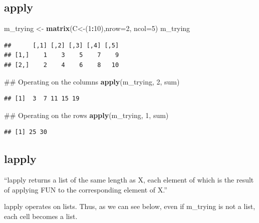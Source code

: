 \documentclass[]{book}
\newenvironment{Shaded}{\begin{snugshade}}{\end{snugshade}}
\newcommand{\KeywordTok}[1]{\textcolor[rgb]{0.13,0.29,0.53}{\textbf{#1}}}
\newcommand{\DataTypeTok}[1]{\textcolor[rgb]{0.13,0.29,0.53}{#1}}
\newcommand{\DecValTok}[1]{\textcolor[rgb]{0.00,0.00,0.81}{#1}}
\newcommand{\StringTok}[1]{\textcolor[rgb]{0.31,0.60,0.02}{#1}}
\newcommand{\OperatorTok}[1]{\textcolor[rgb]{0.81,0.36,0.00}{\textbf{#1}}}
\newcommand{\NormalTok}[1]{#1}
\begin{document}
\subsection{apply}\label{apply}

\begin{Shaded}
\begin{Highlighting}[]
\NormalTok{m_trying <-}\StringTok{ }\KeywordTok{matrix}\NormalTok{(C<-(}\DecValTok{1}\OperatorTok{:}\DecValTok{10}\NormalTok{),}\DataTypeTok{nrow=}\DecValTok{2}\NormalTok{, }\DataTypeTok{ncol=}\DecValTok{5}\NormalTok{)}
\NormalTok{m_trying}
\end{Highlighting}
\end{Shaded}

\begin{verbatim}
##      [,1] [,2] [,3] [,4] [,5]
## [1,]    1    3    5    7    9
## [2,]    2    4    6    8   10
\end{verbatim}

\begin{Shaded}
\begin{Highlighting}[]
\NormalTok{## Operating on the columns}
\KeywordTok{apply}\NormalTok{(m_trying, }\DecValTok{2}\NormalTok{, sum)}
\end{Highlighting}
\end{Shaded}

\begin{verbatim}
## [1]  3  7 11 15 19
\end{verbatim}

\begin{Shaded}
\begin{Highlighting}[]
\NormalTok{## Operating on the rows}
\KeywordTok{apply}\NormalTok{(m_trying, }\DecValTok{1}\NormalTok{, sum)}
\end{Highlighting}
\end{Shaded}

\begin{verbatim}
## [1] 25 30
\end{verbatim}

\subsection{lapply}\label{lapply}

``lapply returns a list of the same length as X, each element of which
is the result of applying FUN to the corresponding element of X.''

lapply operates on lists. Thus, as we can see below, even if m\_trying
is not a list, each cell becomes a list.
\end{document}
